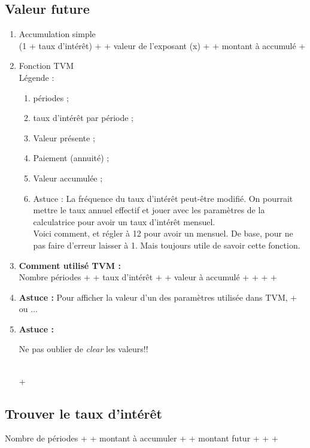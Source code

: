 \subsection{Valeur future}
\begin{enumerate}

\item Accumulation simple
\\ (1 + taux d'intérêt) +  + valeur de l'exposant (x) +  + montant à accumulé + \fbox{=}
\item Fonction TVM
\\ Légende :

\begin{enumerate}
\item {} périodes ;
\item {} taux d'intérêt par période ;
\item {} Valeur présente ;
\item {} Paiement (annuité) ;
\item {} Valeur accumulée ;
\item Astuce : La fréquence du taux d'intérêt peut-être modifié. On pourrait mettre le taux annuel effectif et jouer avec les paramètres de la calculatrice pour avoir un taux d'intérêt mensuel.
\\ Voici comment,  et régler à 12 pour avoir un mensuel. De base, pour ne pas faire d'erreur laisser à 1. Mais toujours utile de savoir cette fonction.
\end{enumerate}

\item \textbf{Comment utilisé TVM :}
\\ Nombre périodes +  + taux d'intérêt +  + valeur à accumulé + \fbox{+$ / $-} +  +  + 
\\ 
\item \textbf{Astuce :} Pour afficher la valeur d'un des paramètres utilisée dans TVM,  +  ou ... 
\\
\item \textbf{Astuce :}
\begin{LARGE}
Ne pas oublier de \textit{clear} les valeurs!!
\end{LARGE}
\\  + 

\end{enumerate}

\subsection{Trouver le taux d'intérêt}
Nombre de périodes +  + montant à accumuler +  + montant futur +  +  + 

